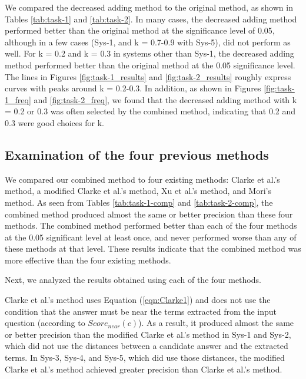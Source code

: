 We compared the decreased adding method to the original method, as shown in 
Tables \ref{tab:task-1} and \ref{tab:task-2}. 
In many cases, 
the decreased adding method performed better
than the original method at the significance level of 0.05, although
in a few cases (Sys-1, and k = 0.7-0.9 with Sys-5), 
did not perform as well. 
For k = 0.2 and k = 0.3 in systems other than Sys-1, 
the decreased adding method performed better 
than the original method at the 0.05 significance level. 
The lines in Figures \ref{fig:task-1_results} and \ref{fig:task-2_results} 
roughly express curves with peaks around k = 0.2-0.3. 
In addition, as shown in Figures \ref{fig:task-1_freq} and \ref{fig:task-2_freq}, 
we found that the decreased adding method with k = 0.2 or 0.3 was often 
selected by the combined method, 
indicating that 0.2 and 0.3 were good choices for k.

\subsection{Examination of the four previous methods}

We compared our combined method 
to four existing methods: Clarke et al.'s method, 
a modified Clarke et al.'s method, 
Xu et al.'s method, and Mori's method. 
As seen from Tables \ref{tab:task-1-comp} and \ref{tab:task-2-comp}, 
the combined method produced almost the same or better precision
than these four methods.
The combined method 
performed better than each of the four methods 
at the 0.05 significant level at least once, and 
never performed worse 
than any of these methods at that level. 
These results indicate that the combined method 
was more effective than the four existing methods. 

Next, we analyzed the results obtained using each of the four methods. 

Clarke et al.'s method uses Equation (\ref{eqn:Clarke1}) 
and does not use the condition 
that the answer must be near the terms extracted from the input question (according to $Score_{near}(c)$).
As a result, 
it produced almost the same or better precision 
than the modified Clarke et al.'s method 
in Sys-1 and Sys-2, which did not use 
the distances between a candidate answer and the extracted terms. 
In Sys-3, Sys-4, and Sys-5,  
which did use
those distances, 
the modified Clarke et al.'s method 
achieved greater precision than Clarke et al.'s method. 

